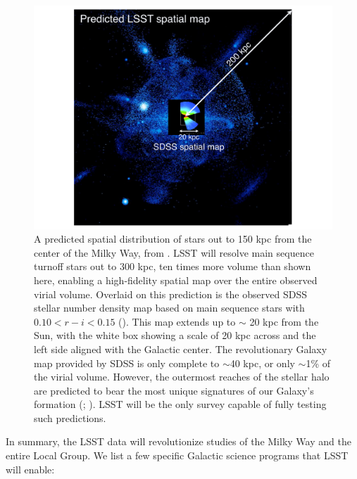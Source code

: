 \begin{figure}
\includegraphics[width=1.\hsize,clip]{BethMWhalo.pdf}
\caption{A predicted spatial distribution of stars out to 150 kpc from the center of the Milky Way,
from \cite{2005ApJ...635..931B}.  LSST will resolve main sequence turnoff stars out to 300 kpc, ten times
more volume than shown here, enabling a high-fidelity spatial map over the entire observed virial volume.
Overlaid on this prediction is the observed SDSS stellar number density map based on main sequence stars
with $0.10 < r-i < 0.15$ (\cite{2008ApJ...673..864J}).  This map extends up to $\sim$ 20 kpc from the Sun, with
the white box showing a scale of 20 kpc across and the left side aligned with the Galactic center.
The revolutionary Galaxy map provided by SDSS is only complete to $\sim$40 kpc, or only $\sim$1\% of
the virial volume.  However, the outermost reaches of the stellar halo are predicted to bear the most unique
signatures of our Galaxy's formation (\cite{2008ApJ...689..936J};  \cite{2010MNRAS.406..744C}).   LSST will be the only survey
capable of fully testing such predictions.}
\label{Fig:halo}
\end{figure}



In summary, the LSST data will revolutionize studies of the Milky Way and the entire Local Group. We list a few specific
Galactic science programs that LSST will enable:

